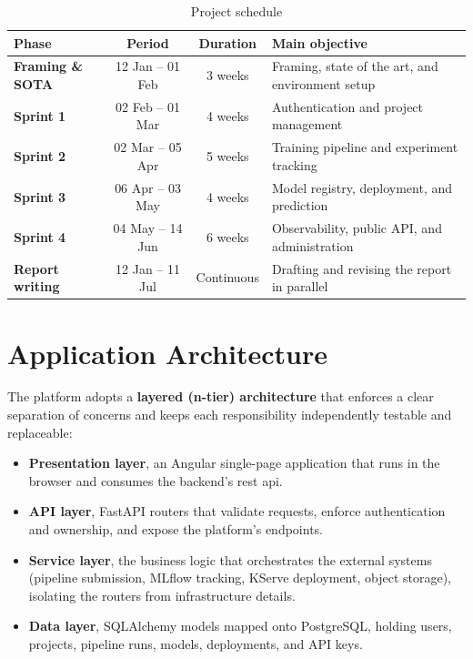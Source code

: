 \begin{table}[H]\centering
\renewcommand{\arraystretch}{1.35}
\caption{Project schedule}\label{tab:schedule}
\begin{tabularx}{\textwidth}{|>{\bfseries}l|c|c|X|}
\hline
\rowcolor{primary!15}
\textbf{Phase} & \textbf{Period} & \textbf{Duration} & \textbf{Main objective}\\
\hline
Framing \& SOTA & 12 Jan -- 01 Feb & 3 weeks & Framing, state of the art, and environment setup\\ \hline
Sprint 1 & 02 Feb -- 01 Mar & 4 weeks & Authentication and project management\\ \hline
Sprint 2 & 02 Mar -- 05 Apr & 5 weeks & Training pipeline and experiment tracking\\ \hline
Sprint 3 & 06 Apr -- 03 May & 4 weeks & Model registry, deployment, and prediction\\ \hline
Sprint 4 & 04 May -- 14 Jun & 6 weeks & Observability, public API, and administration\\ \hline
Report writing & 12 Jan -- 11 Jul & Continuous & Drafting and revising the report in parallel\\ \hline
\end{tabularx}
\end{table}

\section{Application Architecture}
\label{sec:app-architecture}
The platform adopts a \textbf{layered (n-tier) architecture} that enforces a clear
separation of concerns and keeps each responsibility independently testable and
replaceable:

\begin{itemize}[leftmargin=1.4em]
  \item \textbf{Presentation layer}, an Angular single-page application that runs
        in the browser and consumes the backend's \gls{rest} \gls{api}.
  \item \textbf{API layer}, FastAPI routers that validate requests, enforce
        authentication and ownership, and expose the platform's endpoints.
  \item \textbf{Service layer}, the business logic that orchestrates the external
        systems (pipeline submission, MLflow tracking, KServe deployment, object
        storage), isolating the routers from infrastructure details.
  \item \textbf{Data layer}, SQLAlchemy models mapped onto PostgreSQL, holding
        users, projects, pipeline runs, models, deployments, and API keys.
\end{itemize}

